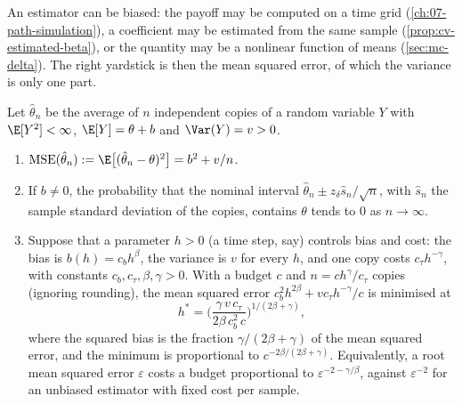 
An estimator can be biased: the payoff may be computed on a time grid (\cref{ch:07-path-simulation}),
a coefficient may be estimated from the same sample (\cref{prop:cv-estimated-beta}), or the
quantity may be a nonlinear function of means (\cref{sec:mc-delta}). The right yardstick is
then the mean squared error, of which the variance is only one part.

\begin{proposition}\label{prop:mc-mse}
Let $\hat\theta_n$ be the average of $n$ independent copies of a random variable $Y$ with
$\E[Y^2]<\infty$, $\E[Y]=\theta+b$ and $\Var(Y)=v>0$.
\begin{enumerate}[label=(\roman*)]
  \item $\mathrm{MSE}(\hat\theta_n):=\E\big[(\hat\theta_n-\theta)^2\big]=b^2+v/n$.
  \item If $b\neq0$, the probability that the nominal interval
    $\hat\theta_n\pm z_\delta\hat s_n/\sqrt n$, with $\hat s_n$ the sample standard deviation
    of the copies, contains $\theta$ tends to $0$ as $n\to\infty$.
  \item Suppose that a parameter $h>0$ (a time step, say) controls bias and cost: the bias
    is $b(h)=c_bh^\beta$, the variance is $v$ for every $h$, and one copy costs
    $c_\tau h^{-\gamma}$, with constants $c_b,c_\tau,\beta,\gamma>0$. With a budget $c$ and
    $n=ch^\gamma/c_\tau$ copies (ignoring rounding), the mean squared error
    $c_b^2h^{2\beta}+vc_\tau h^{-\gamma}/c$ is minimised at
    \[
      h^*=\Big(\frac{\gamma\,v\,c_\tau}{2\beta\,c_b^2\,c}\Big)^{1/(2\beta+\gamma)},
    \]
    where the squared bias is the fraction $\gamma/(2\beta+\gamma)$ of the mean squared
    error, and the minimum is proportional to $c^{-2\beta/(2\beta+\gamma)}$. Equivalently, a
    root mean squared error $\varepsilon$ costs a budget proportional to
    $\varepsilon^{-2-\gamma/\beta}$, against $\varepsilon^{-2}$ for an unbiased estimator with
    fixed cost per sample.
\end{enumerate}
\end{proposition}

